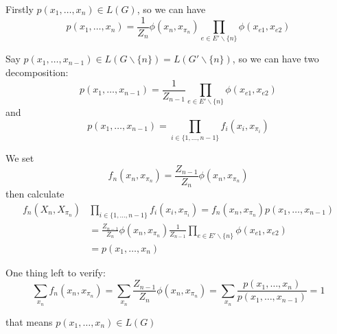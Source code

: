 \documentclass{article}
\begin{document}
	Firstly $p(x_1,\dots,x_n)\in L(G)$, so we can have
	\begin{equation}
	p(x_1,\dots,x_n) = \frac{1}{Z_n} \phi(x_{n}, x_{\pi_n}) \prod_{e\in E'\backslash\{n\}} \phi(x_{e1}, x_{e2})
	\end{equation}
	
	Say $p(x_1,\dots,x_{n-1}) \in L(G\backslash\{n\}) = L(G'\backslash\{n\})$, so we can have two decomposition:
	\begin{equation}
	p(x_1,\dots,x_{n-1}) = \frac{1}{Z_{n-1}} \prod_{e\in E'\backslash\{n\}} \phi(x_{e1}, x_{e2})
	\end{equation}
	and
	\begin{equation}
	p(x_1,\dots,x_{n-1}) = \prod_{i\in \{1,\dots,n-1\}} f_i(x_i, x_{\pi_i})
	\end{equation}
	
	We set 
	\begin{equation}
	f_n(x_n, x_{\pi_n}) =  \frac{Z_{n-1}}{Z_n}  \phi(x_n, x_{\pi_n})
	\end{equation}
	then calculate
	\begin{equation}
	\begin{split}
	f_n(X_n, X_{\pi_n}) &\prod_{i\in \{1,\dots,n-1\}} f_i(x_i, x_{\pi_i}) = f_n(x_n, x_{\pi_n}) p(x_1,\dots,x_{n-1})\\
	&=\frac{Z_{n-1}}{Z_n}  \phi(x_n, x_{\pi_n})  \frac{1}{Z_{n-1}} \prod_{e\in E'\backslash\{n\}} \phi(x_{e1}, x_{e2})\\
	&=p(x_1,\dots,x_{n})
	\end{split}
	\end{equation}
	
	One thing left to verify:
	\begin{equation}
	\sum_{x_n} f_n(x_n, x_{\pi_n}) = \sum_{x_n} \frac{Z_{n-1}}{Z_n}  \phi(x_n, x_{\pi_n}) = \sum_{x_n} \frac{p(x_1,\dots,x_n)}{p(x_1,\dots,x_{n-1})} = 1
	\end{equation}
	
	that means $p(x_1,\dots,x_n) \in L(G)$
	
	
\end{document}
